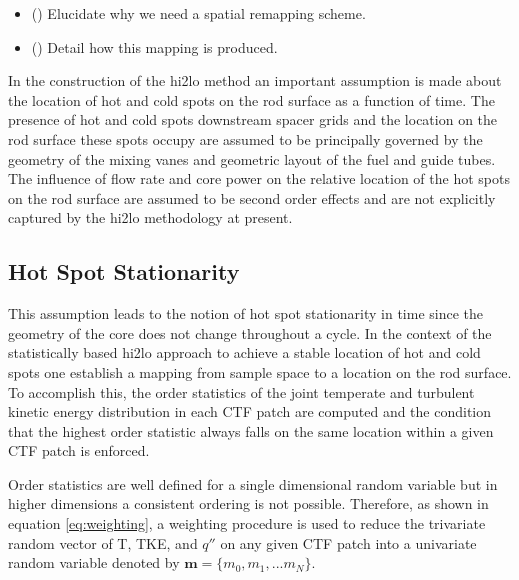 \begin{itemize}
        \item (\checkmark) Elucidate why we need a spatial remapping scheme.
        \item (\checkmark) Detail how this mapping is produced.
\end{itemize}

In the construction of the hi2lo method an important assumption is made about the location of hot and cold spots on the rod surface as a function of time.   The presence of hot and cold spots downstream spacer grids and the location on the rod surface these spots occupy are assumed to be principally governed by the geometry of the mixing vanes and geometric layout of the fuel and guide tubes.  The influence of flow rate and core power on the relative location of the hot spots on the rod surface are assumed to be second order effects and are not explicitly captured by the hi2lo methodology at present.

\subsection{Hot Spot Stationarity}

This assumption leads to the notion of hot spot stationarity in time since the geometry of the core does not change throughout a cycle.  In the context of the statistically based hi2lo approach to achieve a stable location of hot and cold spots one establish a mapping from sample space to a location on the rod surface.  To accomplish this, the order statistics of the joint temperate and turbulent kinetic energy distribution in each CTF patch are computed and the condition that the highest order statistic always falls on the same location within a given CTF patch is enforced.

Order statistics are well defined for a single dimensional random variable but in higher dimensions a consistent ordering is not possible.  Therefore, as shown in equation \ref{eq:weighting}, a weighting procedure is used to reduce the trivariate random vector of T, TKE, and $q''$ on any given CTF patch into a univariate random variable denoted by $\mathbf{m}=\{m_0, m_1, ... m_N\}$.

